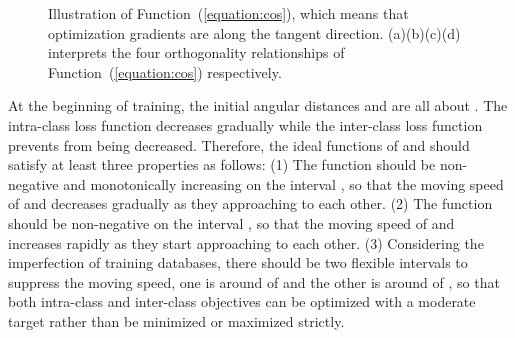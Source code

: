 \documentclass[journal,comsoc]{IEEEtran}
\begin{document}
\begin{figure}[htbp]
	\centering
	
	\caption{Illustration of Function~(\ref{equation:cos}), which means that optimization gradients are along the tangent direction. (a)(b)(c)(d) interprets the four orthogonality relationships of Function~(\ref{equation:cos}) respectively.}
	\label{fig:cos}
\end{figure}

At the beginning of training, the initial angular distances  and  are all about . The intra-class loss function decreases  gradually while the inter-class loss function prevents  from being decreased. Therefore, the ideal functions of  and  should satisfy at least three properties as follows: (1) The function  should be non-negative and monotonically increasing on the interval , so that the moving speed of  and  decreases gradually as they approaching to each other. (2) The function  should be non-negative on the interval , so that the moving speed of  and  increases rapidly as they start approaching to each other. (3) Considering the imperfection of training databases, there should be two flexible intervals to suppress the moving speed, one is around  of  and the other is around  of , so that both intra-class and inter-class objectives can be optimized with a moderate target rather than be minimized or maximized strictly.
\end{document}
